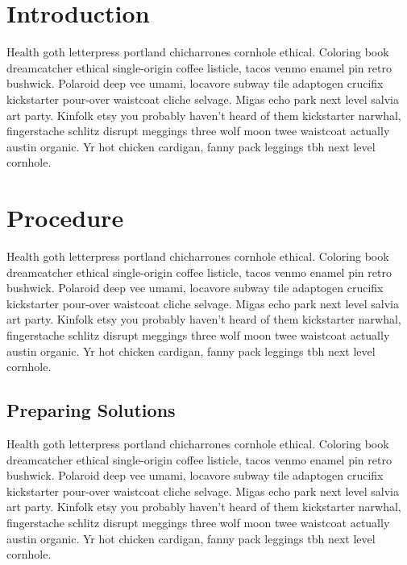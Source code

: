 \documentclass[titlepage,11pt]{article}
\title{\vspace*{-1.51cm}\mydoctitle\vspace*{-.5cm}}
\author{\normalsize\myname}
\date{\vspace*{-.3cm}\normalsize\today\vspace*{-.2cm}}
\begin{document}
\maketitle

\section*{Introduction}

Health goth letterpress portland chicharrones cornhole ethical. Coloring book dreamcatcher ethical single-origin coffee listicle, tacos venmo enamel pin retro bushwick. Polaroid deep vee umami, locavore subway tile adaptogen crucifix kickstarter pour-over waistcoat cliche selvage. Migas echo park next level salvia art party. Kinfolk etsy you probably haven't heard of them kickstarter narwhal, fingerstache schlitz disrupt meggings three wolf moon twee waistcoat actually austin organic. Yr hot chicken cardigan, fanny pack leggings tbh next level cornhole.

\section*{Procedure}

Health goth letterpress portland chicharrones cornhole ethical. Coloring book dreamcatcher ethical single-origin coffee listicle, tacos venmo enamel pin retro bushwick. Polaroid deep vee umami, locavore subway tile adaptogen crucifix kickstarter pour-over waistcoat cliche selvage. Migas echo park next level salvia art party. Kinfolk etsy you probably haven't heard of them kickstarter narwhal, fingerstache schlitz disrupt meggings three wolf moon twee waistcoat actually austin organic. Yr hot chicken cardigan, fanny pack leggings tbh next level cornhole.

\subsection*{Preparing Solutions}

Health goth letterpress portland chicharrones cornhole ethical. Coloring book dreamcatcher ethical single-origin coffee listicle, tacos venmo enamel pin retro bushwick. Polaroid deep vee umami, locavore subway tile adaptogen crucifix kickstarter pour-over waistcoat cliche selvage. Migas echo park next level salvia art party. Kinfolk etsy you probably haven't heard of them kickstarter narwhal, fingerstache schlitz disrupt meggings three wolf moon twee waistcoat actually austin organic. Yr hot chicken cardigan, fanny pack leggings tbh next level cornhole.
\end{document}
